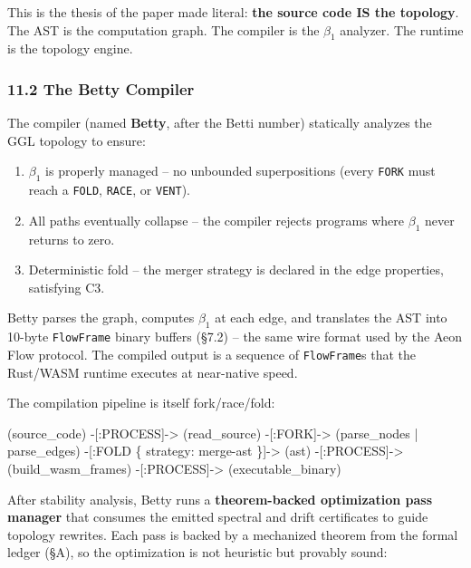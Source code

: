 \documentclass[
  11pt,
]{article}
\newenvironment{Shaded}{}{}
\newcommand{\NormalTok}[1]{#1}
\begin{document}
This is the thesis of the paper made literal: \textbf{the source code IS
the topology}. The AST is the computation graph. The compiler is the
\(\beta_1\) analyzer. The runtime is the topology engine.

\subsubsection{11.2 The Betty Compiler}\label{the-betty-compiler}

The compiler (named \textbf{Betty}, after the Betti number) statically
analyzes the GGL topology to ensure:

\begin{enumerate}
\def\labelenumi{\arabic{enumi}.}
\item
  \(\beta_1\) is properly managed -- no unbounded superpositions (every
  \texttt{FORK} must reach a \texttt{FOLD}, \texttt{RACE}, or
  \texttt{VENT}).
\item
  All paths eventually collapse -- the compiler rejects programs where
  \(\beta_1\) never returns to zero.
\item
  Deterministic fold -- the merger strategy is declared in the edge
  properties, satisfying C3.
\end{enumerate}

Betty parses the graph, computes \(\beta_1\) at each edge, and
translates the AST into 10-byte \texttt{FlowFrame} binary buffers (§7.2)
-- the same wire format used by the Aeon Flow protocol. The compiled
output is a sequence of \texttt{FlowFrame}s that the Rust/WASM runtime
executes at near-native speed.

The compilation pipeline is itself fork/race/fold:

\begin{Shaded}
\begin{Highlighting}[]
\NormalTok{(source\_code) {-}[:PROCESS]{-}\textgreater{} (read\_source)}
\NormalTok{  {-}[:FORK]{-}\textgreater{} (parse\_nodes | parse\_edges)}
\NormalTok{  {-}[:FOLD \{ strategy: \textquotesingle{}merge{-}ast\textquotesingle{} \}]{-}\textgreater{} (ast)}
\NormalTok{  {-}[:PROCESS]{-}\textgreater{} (build\_wasm\_frames)}
\NormalTok{  {-}[:PROCESS]{-}\textgreater{} (executable\_binary)}
\end{Highlighting}
\end{Shaded}

After stability analysis, Betty runs a \textbf{theorem-backed
optimization pass manager} that consumes the emitted spectral and drift
certificates to guide topology rewrites. Each pass is backed by a
mechanized theorem from the formal ledger (§A), so the optimization is
not heuristic but provably sound:
\end{document}
